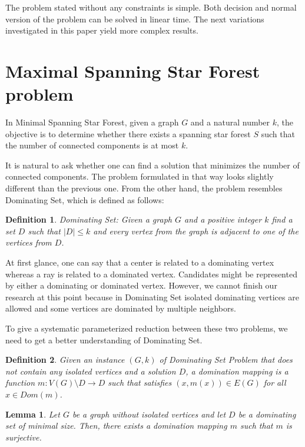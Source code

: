 \documentclass[en]{pracamgr}
\newtheorem{definition}{Definition}
\newtheorem{lemma}{Lemma}
\newcommand{\ssf}{spanning star forest}
\newcommand{\mssfp}{{\sc Minimal Spanning Star Forest}}
\newcommand{\domsetp}{{\sc Dominating Set}}
\begin{document}
The problem stated without any constraints is simple. Both decision and normal version of the problem can be solved in linear time. The next variations investigated in this paper yield more complex results.

\section{Maximal Spanning Star Forest problem}

In \mssfp{}, given a graph $G$ and a natural number $k$, the objective is to determine whether there exists a \ssf{} $S$ such that the number of connected components is at most $k$.

It is natural to ask whether one can find a solution that minimizes the number of connected components. The problem formulated in that way looks slightly different than the previous one. From the other hand, the problem resembles \domsetp{}, which is defined as follows:

\begin{definition}
	\domsetp: Given a graph $G$ and a positive integer $k$ find a set $D$ such that $|D| \leq k$ and every vertex from the graph is adjacent to one of the vertices from $D$.
\end{definition}

At first glance, one can say that a center is related to a dominating vertex whereas a ray is related to a dominated vertex. Candidates might be represented by either a dominating or dominated vertex. However, we cannot finish our research at this point because in \domsetp{} isolated dominating vertices are allowed and some vertices are dominated by multiple neighbors. 

To give a systematic parameterized reduction between these two problems, we need to get a better understanding of \domsetp{}.

\begin{definition}
	Given an instance $(G,k)$ of Dominating Set Problem that does not contain any isolated vertices and a solution $D$, a {\normalfont domination mapping} is a function $m:V(G) \setminus D \rightarrow D$ such that satisfies $(x,m(x)) \in E(G)$ for all $x \in Dom(m)$.
\end{definition}

\begin{lemma}\label{dom mapping}
	Let $G$ be a graph without isolated vertices and let $D$ be a dominating set of minimal size. Then, there exists a domination mapping $m$ such that $m$ is surjective.
\end{lemma}
\end{document}
